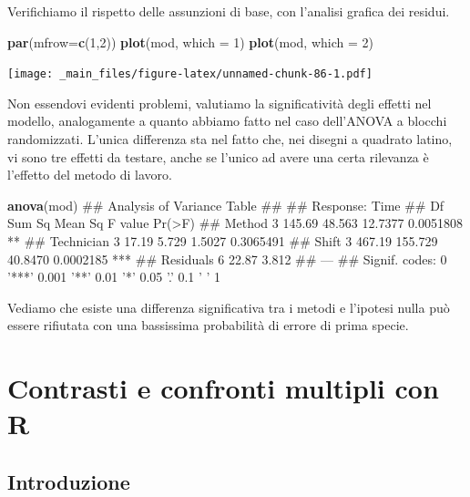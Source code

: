 \documentclass[a4paper,12pt,oneside]{book}
\newenvironment{Shaded}{\begin{snugshade}}{\end{snugshade}}
\newcommand{\KeywordTok}[1]{\textcolor[rgb]{0.13,0.29,0.53}{\textbf{#1}}}
\newcommand{\DataTypeTok}[1]{\textcolor[rgb]{0.13,0.29,0.53}{#1}}
\newcommand{\DecValTok}[1]{\textcolor[rgb]{0.00,0.00,0.81}{#1}}
\newcommand{\NormalTok}[1]{#1}
\theoremstyle{definition}
\theoremstyle{definition}
\theoremstyle{definition}
\theoremstyle{remark}
\begin{document}
Verifichiamo il rispetto delle assunzioni di base, con l'analisi grafica
dei residui.

\begin{Shaded}
\begin{Highlighting}[]
\KeywordTok{par}\NormalTok{(}\DataTypeTok{mfrow=}\KeywordTok{c}\NormalTok{(}\DecValTok{1}\NormalTok{,}\DecValTok{2}\NormalTok{))}
\KeywordTok{plot}\NormalTok{(mod, }\DataTypeTok{which =} \DecValTok{1}\NormalTok{)}
\KeywordTok{plot}\NormalTok{(mod, }\DataTypeTok{which =} \DecValTok{2}\NormalTok{)}
\end{Highlighting}
\end{Shaded}

\texttt{[image: \_main\_files/figure-latex/unnamed-chunk-86-1.pdf]}

Non essendovi evidenti problemi, valutiamo la significatività degli
effetti nel modello, analogamente a quanto abbiamo fatto nel caso
dell'ANOVA a blocchi randomizzati. L'unica differenza sta nel fatto che,
nei disegni a quadrato latino, vi sono tre effetti da testare, anche se
l'unico ad avere una certa rilevanza è l'effetto del metodo di lavoro.

\begin{Shaded}
\begin{Highlighting}[]
\KeywordTok{anova}\NormalTok{(mod)}
\NormalTok{## Analysis of Variance Table}
\NormalTok{## }
\NormalTok{## Response: Time}
\NormalTok{##            Df Sum Sq Mean Sq F value    Pr(>F)    }
\NormalTok{## Method      3 145.69  48.563 12.7377 0.0051808 ** }
\NormalTok{## Technician  3  17.19   5.729  1.5027 0.3065491    }
\NormalTok{## Shift       3 467.19 155.729 40.8470 0.0002185 ***}
\NormalTok{## Residuals   6  22.87   3.812                      }
\NormalTok{## ---}
\NormalTok{## Signif. codes:  0 '***' 0.001 '**' 0.01 '*' 0.05 '.' 0.1 ' ' 1}
\end{Highlighting}
\end{Shaded}

Vediamo che esiste una differenza significativa tra i metodi e l'ipotesi
nulla può essere rifiutata con una bassissima probabilità di errore di
prima specie.

\chapter{Contrasti e confronti multipli con
R}\label{contrasti-e-confronti-multipli-con-r}

\section{Introduzione}\label{introduzione-4}
\end{document}

